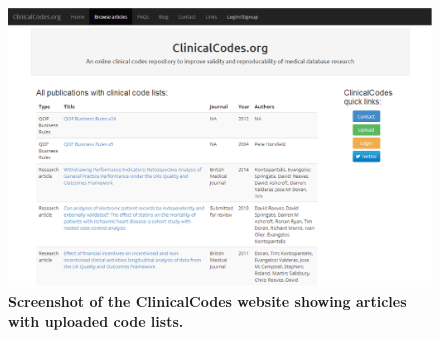 \documentclass[10pt]{article}
\begin{document}
\begin{figure}[!ht]
\begin{center}
  \includegraphics[width=6in]{figure/clinicalcodes_screenshot.eps}
\end{center}
\caption{
    {\bf Screenshot of the ClinicalCodes website showing articles with uploaded code lists.}
}
\label{figure3_screenshot}
\end{figure}
\end{document}
